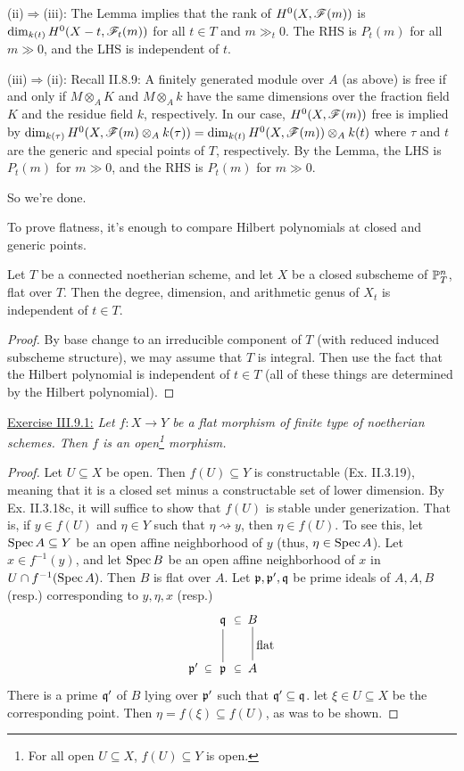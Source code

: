  (ii)$\Rightarrow$(iii): The Lemma implies that the rank of
 $H^0(X,\F(m))$ is $\dim_{k(t)} H^0(X-t,\F_t(m))$ for all $t\in T$
 and $m\gg_t 0$.  The RHS is $P_t(m)$ for all $m\gg 0$, and the
 LHS is independent of $t$.

 (iii)$\Rightarrow$(ii): Recall II.8.9: A finitely generated
 module over $A$ (as above) is free if and only if $M\otimes_A K$
 and $M\otimes_A k$ have the same dimensions over the fraction
 field $K$ and the residue field $k$, respectively.  In our case,
 $H^0(X,\F(m))$  free is implied by $\dim_{k(\tau)}
 H^0(X,\F(m)\otimes_A k(\tau)) = \dim_{k(t)} H^0(X,\F(m))\otimes_A
 k(t)$ where $\tau$ and $t$ are the generic and special points of
 $T$, respectively.  By the Lemma, the LHS is $P_t(m)$ for $m\gg
 0$, and the RHS is $P_t(m)$ for $m\gg 0$.

 So we're done.

 \begin{remark}
 To prove flatness, it's enough to compare Hilbert polynomials at
 closed and generic points.
 \end{remark}

 \begin{corollary}
 Let $T$ be a connected noetherian scheme, and let $X$ be a closed
 subscheme of $\P^n_T$, flat over $T$.  Then the degree, dimension, and
 arithmetic genus of $X_t$ is independent of $t\in T$.
 \end{corollary}
 \begin{proof}
 By base change to an irreducible component of $T$ (with reduced induced
 subscheme structure), we may assume
 that $T$ is integral.  Then use the fact that the Hilbert
 polynomial is independent of $t\in T$ (all of these things are determined
 by the Hilbert polynomial).
 \end{proof}

 \underline{Exercise III.9.1:} {\it Let $f:X\to Y$ be a flat morphism
 of finite type of noetherian schemes.  Then $f$ is an
 open\footnote{For all open $U\subseteq X$, $f(U)\subseteq Y$ is open.}
 morphism.}
 \begin{proof}
 Let $U\subseteq X$ be open.  Then $f(U)\subseteq Y$ is
 constructable (Ex. II.3.19), meaning that it is a closed set
 minus a constructable set of lower dimension.  By Ex. II.3.18c, it
 will suffice to show that $f(U)$ is stable under generization.
 That is, if $y\in f(U)$ and $\eta\in Y$ such that $\eta
 \rightsquigarrow y$, then $\eta \in f(U)$.  To see this, let
 $\spec A\subseteq Y$ be an open affine neighborhood of $y$ (thus,
 $\eta\in \spec A$).  Let $x\in f^{-1}(y)$, and let $\spec B$ be an
 open affine neighborhood of $x$ in $U\cap f^{-1}(\spec A)$.  Then
 $B$ is flat over $A$.  Let $\p,\p',\q$ be prime ideals of $A,A,
 B$ (resp.) corresponding to $y,\eta,x$ (resp.)
 \[\xymatrix @C=4mm {
  & \q \ar@{}[r]|{\subseteq} \ar@{-}[d] & B \ar@{-}[d]^{\txt{flat}}\\
  \p'\ar@{}[r]|{\subseteq} & \p\ar@{}[r]|{\subseteq} & A
 }\]
 There is a prime $\q'$ of $B$ lying over $\p'$ such that
 $\q'\subseteq \q$.  let $\xi\in U\subseteq X$ be the
 corresponding point.  Then $\eta = f(\xi) \subseteq f(U)$, as was
 to be shown.
 \end{proof}

